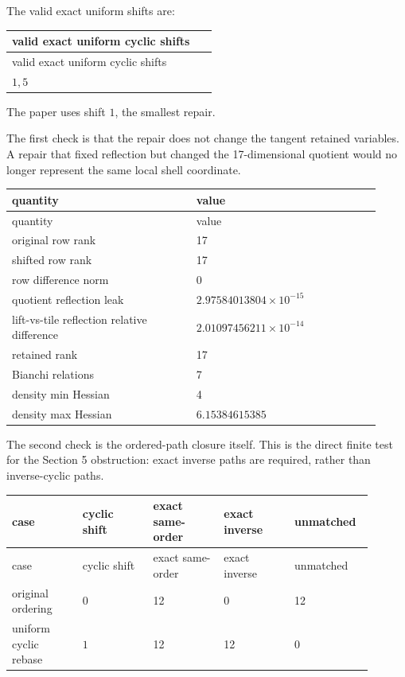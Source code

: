 \documentclass[10pt]{article}
\begin{document}
The valid exact uniform shifts are:

\begin{center}
\small
\begin{longtable}{|p{0.92\linewidth}|}
\hline
valid exact uniform cyclic shifts \\
\hline
\endfirsthead
\hline
valid exact uniform cyclic shifts \\
\hline
\endhead
\(1,5\) \\
\hline
\end{longtable}
\end{center}

The paper uses shift \(1\), the smallest repair.

The first check is that the repair does not change the tangent retained variables.  A repair that fixed reflection but changed the 17-dimensional quotient would no longer represent the same local shell coordinate.

\begin{center}
\small
\begin{longtable}{|p{0.46\linewidth}|p{0.46\linewidth}|}
\hline
quantity & value \\
\hline
\endfirsthead
\hline
quantity & value \\
\hline
\endhead
original row rank & 17 \\
\hline
shifted row rank & 17 \\
\hline
row difference norm & 0 \\
\hline
quotient reflection leak & \(2.97584013804\times10^{-15}\) \\
\hline
lift-vs-tile reflection relative difference & \(2.01097456211\times10^{-14}\) \\
\hline
retained rank & 17 \\
\hline
Bianchi relations & 7 \\
\hline
density min Hessian & 4 \\
\hline
density max Hessian & \(6.15384615385\) \\
\hline
\end{longtable}
\end{center}

The second check is the ordered-path closure itself.  This is the direct finite test for the Section 5 obstruction: exact inverse paths are required, rather than inverse-cyclic paths.

\begin{center}
\small
\begin{longtable}{|p{0.18\linewidth}|p{0.18\linewidth}|p{0.18\linewidth}|p{0.18\linewidth}|p{0.18\linewidth}|}
\hline
case & cyclic shift & exact same-order & exact inverse & unmatched \\
\hline
\endfirsthead
\hline
case & cyclic shift & exact same-order & exact inverse & unmatched \\
\hline
\endhead
original ordering & \(0\) & 12 & 0 & 12 \\
\hline
uniform cyclic rebase & \(1\) & 12 & 12 & 0 \\
\hline
\end{longtable}
\end{center}
\end{document}
